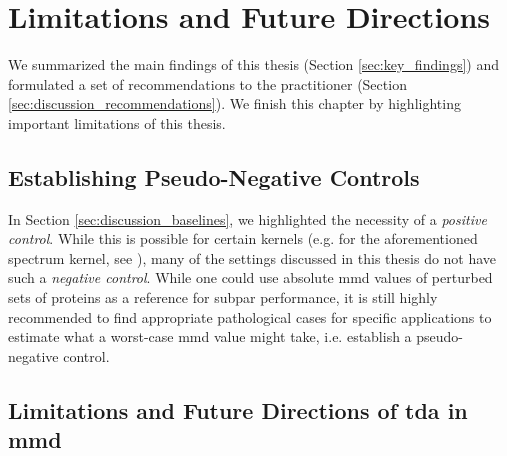 \section{Limitations and Future Directions}\label{sec:discussion_limitations}

We summarized the main findings of this thesis (Section \ref{sec:key_findings})
and formulated a set of recommendations to the practitioner (Section
\ref{sec:discussion_recommendations}). We finish this chapter by highlighting
important limitations of this thesis.

\subsection{Establishing Pseudo-Negative Controls}

In Section \ref{sec:discussion_baselines}, we highlighted the necessity of a
\emph{positive control}. While this is possible for certain kernels (e.g. for
the aforementioned spectrum kernel, see \cite{kucera2022conditional}), many of
the settings discussed in this thesis do not have such a \emph{negative control}.
While one could use absolute \gls{mmd} values of perturbed sets of proteins
as a reference for subpar performance, it is still highly recommended to find
appropriate pathological cases for specific applications to estimate what a
worst-case \gls{mmd} value might take, i.e. establish a pseudo-negative control.



\subsection{Limitations and Future Directions of \gls{tda} in \gls{mmd}}\label{sec:tda_limitations}

